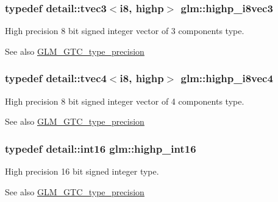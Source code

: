 \subsubsection[{\texorpdfstring{highp\+\_\+i8vec3}{highp_i8vec3}}]{\setlength{\rightskip}{0pt plus 5cm}typedef detail\+::tvec3$<$i8, highp$>$ {\bf glm\+::highp\+\_\+i8vec3}}\hypertarget{group__gtc__type__precision_gad716792169ce7de963df25b865714438}{}\label{group__gtc__type__precision_gad716792169ce7de963df25b865714438}
High precision 8 bit signed integer vector of 3 components type. \begin{DoxySeeAlso}{See also}
\hyperlink{group__gtc__type__precision}{G\+L\+M\+\_\+\+G\+T\+C\+\_\+type\+\_\+precision} 
\end{DoxySeeAlso}
\subsubsection[{\texorpdfstring{highp\+\_\+i8vec4}{highp_i8vec4}}]{\setlength{\rightskip}{0pt plus 5cm}typedef detail\+::tvec4$<$i8, highp$>$ {\bf glm\+::highp\+\_\+i8vec4}}\hypertarget{group__gtc__type__precision_ga283b2f580a4bd7207d27418ef4a1068b}{}\label{group__gtc__type__precision_ga283b2f580a4bd7207d27418ef4a1068b}
High precision 8 bit signed integer vector of 4 components type. \begin{DoxySeeAlso}{See also}
\hyperlink{group__gtc__type__precision}{G\+L\+M\+\_\+\+G\+T\+C\+\_\+type\+\_\+precision} 
\end{DoxySeeAlso}
\subsubsection[{\texorpdfstring{highp\+\_\+int16}{highp_int16}}]{\setlength{\rightskip}{0pt plus 5cm}typedef detail\+::int16 {\bf glm\+::highp\+\_\+int16}}\hypertarget{group__gtc__type__precision_gaf0430ed80e88c0d1dfbe47f359659c81}{}\label{group__gtc__type__precision_gaf0430ed80e88c0d1dfbe47f359659c81}
High precision 16 bit signed integer type. \begin{DoxySeeAlso}{See also}
\hyperlink{group__gtc__type__precision}{G\+L\+M\+\_\+\+G\+T\+C\+\_\+type\+\_\+precision} 
\end{DoxySeeAlso}
